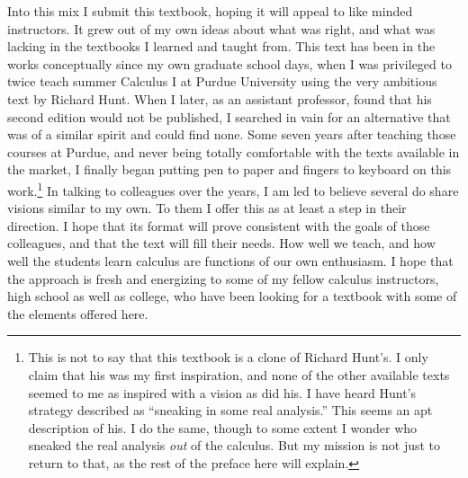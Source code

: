 Into this mix I submit this textbook, hoping it will
appeal to like minded instructors.  It grew out of
my own ideas about what was right, and what was lacking in
the textbooks I learned and taught from.  This text has been in
the works conceptually since my own graduate school days, when I
was privileged to twice teach summer Calculus I at Purdue
University using the very ambitious text by Richard Hunt.
When I later, as an assistant professor,
found that his second edition would not be published, 
I searched in vain for an alternative that was of a similar
spirit and could find none. 
Some seven years after teaching those courses at Purdue, and
never being totally comfortable with the texts available in the
market,
I finally began
putting pen to paper and fingers to keyboard on this
 work.\footnote{%
This is not to say that this textbook is a clone of Richard Hunt's.
I only claim that his was my first inspiration, and none
of the other available texts seemed to me as inspired with
a vision as did his.  I have heard Hunt's strategy described
as ``sneaking in some real analysis.''  This seems an apt description
of his.  I do the same, though to some extent I wonder who
sneaked the real analysis {\it out} of the calculus.  
But my mission is not just to return to that, as the rest of the preface
here will explain.
}  
In talking to colleagues over the years, I 
am led to believe several do share visions similar to my own.
To them I offer this as at least a step in their direction.
I hope that its format will prove consistent with
the goals of those colleagues, and that the text will
fill their needs. 
How well we teach, and how well the students learn calculus are
functions of our own enthusiasm.  I
hope that the approach is fresh and energizing to
some of my fellow 
calculus instructors, high school as well as college,
who have been looking for a textbook
with some of the elements offered here.



